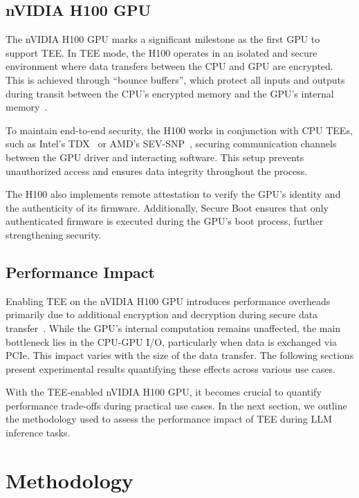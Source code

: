 \documentclass{article}
\begin{document}
\subsection{nVIDIA H100 GPU}

The nVIDIA H100 GPU marks a significant milestone as the first GPU to support TEE. In TEE mode, the H100 operates in an isolated and secure environment where data transfers between the CPU and GPU are encrypted. This is achieved through ``bounce buffers'', which protect all inputs and outputs during transit between the CPU’s encrypted memory and the GPU’s internal memory~\cite{dhanuskodi2023creating}.

To maintain end-to-end security, the H100 works in conjunction with CPU TEEs, such as Intel’s TDX~\cite{TDX} or AMD’s SEV-SNP~\cite{SEV-SNP, sev2020strengthening}, securing communication channels between the GPU driver and interacting software. This setup prevents unauthorized access and ensures data integrity throughout the process.

The H100 also implements remote attestation to verify the GPU’s identity and the authenticity of its firmware. Additionally, Secure Boot ensures that only authenticated firmware is executed during the GPU’s boot process, further strengthening security.

\subsection{Performance Impact}

Enabling TEE on the nVIDIA H100 GPU introduces performance overheads primarily due to additional encryption and decryption during secure data transfer~\cite{mohan2024securing}. While the GPU’s internal computation remains unaffected, the main bottleneck lies in the CPU-GPU I/O, particularly when data is exchanged via PCIe. This impact varies with the size of the data transfer. The following sections present experimental results quantifying these effects across various use cases.

With the TEE-enabled nVIDIA H100 GPU, it becomes crucial to quantify performance trade-offs during practical use cases. In the next section, we outline the methodology used to assess the performance impact of TEE during LLM inference tasks.

\section{Methodology}
\end{document}
